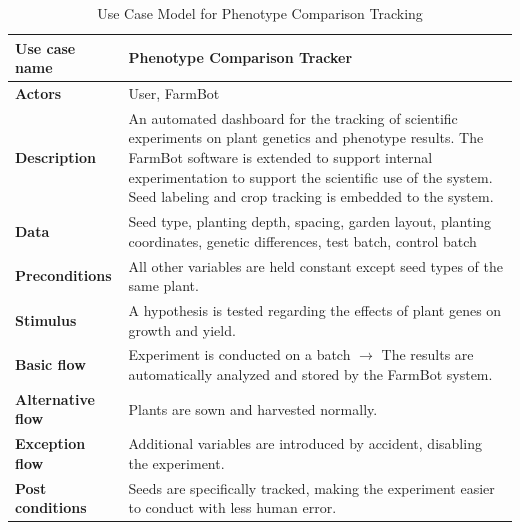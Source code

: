 \begin{table}[H]
\centering
\footnotesize
\begin{tabular}{|p{3.5cm}|p{8.5cm}|}
\hline
\textbf{Use case name}    & Phenotype Comparison Tracker \\
\hline
\textbf{Actors}           & User, FarmBot \\
\hline
\textbf{Description}      & An automated dashboard for the tracking of scientific experiments on plant genetics and phenotype results. The FarmBot software is extended to support internal experimentation to support the scientific use of the system. Seed labeling and crop tracking is embedded to the system. \\
\hline
\textbf{Data}             & Seed type, planting depth, spacing, garden layout, planting coordinates, genetic differences, test batch, control batch \\
\hline
\textbf{Preconditions}    & All other variables are held constant except seed types of the same plant. \\
\hline
\textbf{Stimulus}         & A hypothesis is tested regarding the effects of plant genes on growth and yield. \\
\hline
\textbf{Basic flow}       & Experiment is conducted on a batch $\rightarrow$ The results are automatically analyzed and stored by the FarmBot system. \\
\hline
\textbf{Alternative flow} & Plants are sown and harvested normally. \\
\hline
\textbf{Exception flow}   & Additional variables are introduced by accident, disabling the experiment. \\
\hline
\textbf{Post conditions}  & Seeds are specifically tracked, making the experiment easier to conduct with less human error. \\
\hline
\end{tabular}
\caption{Use Case Model for Phenotype Comparison Tracking}
\end{table}

